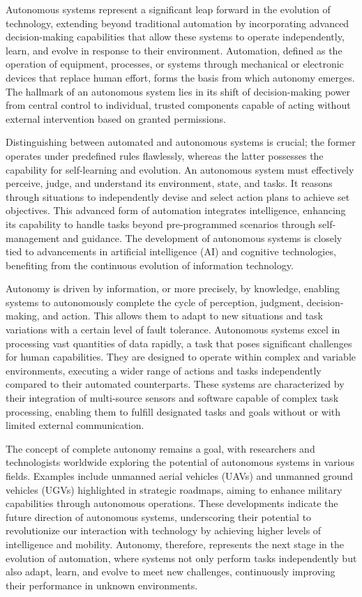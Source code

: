 Autonomous systems represent a significant leap forward in the evolution of technology, extending beyond traditional automation by incorporating advanced decision-making capabilities that allow these systems to operate independently, learn, and evolve in response to their environment. Automation, defined as the operation of equipment, processes, or systems through mechanical or electronic devices that replace human effort, forms the basis from which autonomy emerges. The hallmark of an autonomous system lies in its shift of decision-making power from central control to individual, trusted components capable of acting without external intervention based on granted permissions.

Distinguishing between automated and autonomous systems is crucial; the former operates under predefined rules flawlessly, whereas the latter possesses the capability for self-learning and evolution. An autonomous system must effectively perceive, judge, and understand its environment, state, and tasks. It reasons through situations to independently devise and select action plans to achieve set objectives. This advanced form of automation integrates intelligence, enhancing its capability to handle tasks beyond pre-programmed scenarios through self-management and guidance. The development of autonomous systems is closely tied to advancements in artificial intelligence (AI) and cognitive technologies, benefiting from the continuous evolution of information technology.

Autonomy is driven by information, or more precisely, by knowledge, enabling systems to autonomously complete the cycle of perception, judgment, decision-making, and action. This allows them to adapt to new situations and task variations with a certain level of fault tolerance. Autonomous systems excel in processing vast quantities of data rapidly, a task that poses significant challenges for human capabilities. They are designed to operate within complex and variable environments, executing a wider range of actions and tasks independently compared to their automated counterparts. These systems are characterized by their integration of multi-source sensors and software capable of complex task processing, enabling them to fulfill designated tasks and goals without or with limited external communication.

The concept of complete autonomy remains a goal, with researchers and technologists worldwide exploring the potential of autonomous systems in various fields. Examples include unmanned aerial vehicles (UAVs) and unmanned ground vehicles (UGVs) highlighted in strategic roadmaps, aiming to enhance military capabilities through autonomous operations. These developments indicate the future direction of autonomous systems, underscoring their potential to revolutionize our interaction with technology by achieving higher levels of intelligence and mobility. Autonomy, therefore, represents the next stage in the evolution of automation, where systems not only perform tasks independently but also adapt, learn, and evolve to meet new challenges, continuously improving their performance in unknown environments.


